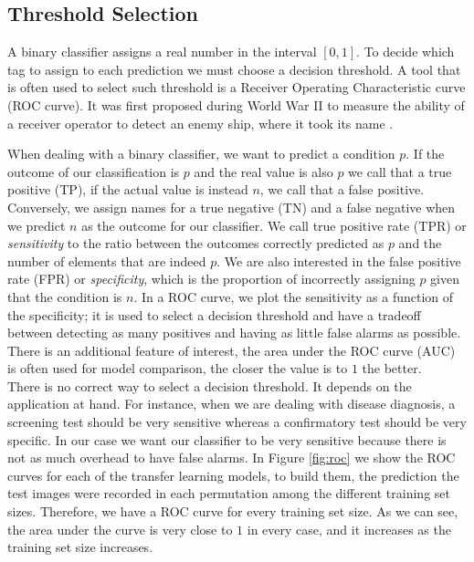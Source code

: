\subsection{Threshold Selection}

A binary classifier assigns a real number in the interval $[0,1]$. To decide which tag to assign to each prediction we must choose a decision threshold. A tool that is often used to select such threshold is a Receiver Operating Characteristic curve (ROC curve). It was first proposed during World War II to measure the ability of a receiver operator to detect an enemy ship, where it took its name \cite{GreenSwets66}.

When dealing with a binary classifier, we want to predict a condition $p$. If the outcome of our classification is $p$ and the real value is also $p$ we call that a true positive (TP), if the actual value is instead $n$, we call that a false positive. Conversely, we assign names for a true negative (TN) and a false negative when we predict $n$ as the outcome for our classifier. We call true positive rate (TPR) or \textit{sensitivity} to the ratio between the outcomes correctly predicted as $p$ and the number of elements that are indeed $p$. We are also interested in the false positive rate (FPR) or \textit{specificity}, which is the proportion of incorrectly assigning $p$ given that the condition is $n$. In a ROC curve, we plot the sensitivity as a function of the specificity; it is used to select a decision threshold and have a tradeoff between detecting as many positives and having as little false alarms as possible. There is an additional feature of interest, the area under the ROC curve (AUC) is often used for model comparison, the closer the value is to $1$ the better.\\

There is no correct way to select a decision threshold. It depends on the application at hand. For instance, when we are dealing with disease diagnosis, a screening test should be very sensitive whereas a confirmatory test should be very specific. In our case we want our classifier to be very sensitive because there is not as much overhead to have false alarms. In Figure \ref{fig:roc} we show the ROC curves for each of the transfer learning models, to build them, the prediction the test images were recorded in each permutation among the different training set sizes. Therefore, we have a ROC curve for every training set size. As we can see, the area under the curve is very close to $1$ in every case, and it increases as the training set size increases.\\

